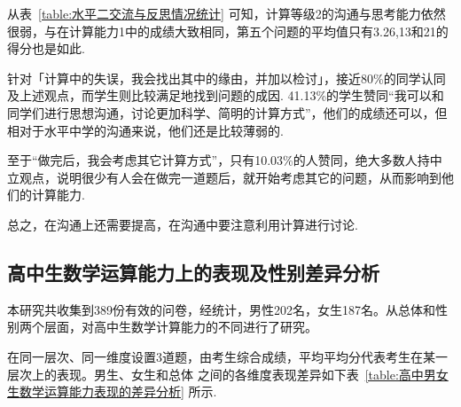 \begin{enumerate}[(1)]
  从表~\ref{table:水平二交流与反思情况统计} 可知，计算等级2的沟通与思考能力依然很弱，与在计算能力1中的成绩大致相同，第五个问题的平均值只有3.26,13和21的得分也是如此.

  针对「计算中的失误，我会找出其中的缘由，并加以检讨」，接近80\%的同学认同及上述观点，而学生则比较满足地找到问题的成因.
  41.13\%的学生赞同“我可以和同学们进行思想沟通，讨论更加科学、简明的计算方式”，他们的成绩还可以，但相对于水平中学的沟通来说，他们还是比较薄弱的.

  至于“做完后，我会考虑其它计算方式”，只有10.03\%的人赞同，绝大多数人持中立观点，说明很少有人会在做完一道题后，就开始考虑其它的问题，从而影响到他们的计算能力.

  总之，在沟通上还需要提高，在沟通中要注意利用计算进行讨论.
  

\end{enumerate}


\subsection{高中生数学运算能力上的表现及性别差异分析}

本研究共收集到389份有效的问卷，经统计，男性202名，女生187名。从总体和性别两个层面，对高中生数学计算能力的不同进行了研究。


在同一层次、同一维度设置3道题，由考生综合成绩，平均平均分代表考生在某一层次上的表现。男生、女生和总体 之间的各维度表现差异如下表~\ref{table:高中男女生数学运算能力表现的差异分析} 所示.


